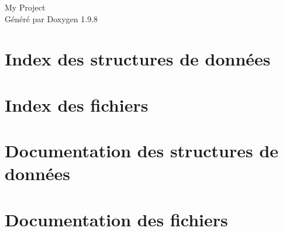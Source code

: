 \documentclass[twoside]{book}
\newcommand{\+}{\discretionary{\mbox{\scriptsize$\hookleftarrow$}}{}{}}
\newcommand{\clearemptydoublepage}{%
    \newpage{\pagestyle{empty}\cleardoublepage}%
  }
\begin{document}
  \raggedbottom
  \begin{titlepage}
  \vspace*{7cm}
  \begin{center}%
  {\Large My Project}\\
  \vspace*{1cm}
  {\large Généré par Doxygen 1.9.8}\\
  \end{center}
  \end{titlepage}
  \clearemptydoublepage
  \tableofcontents
  \clearemptydoublepage
\chapter{Index des structures de données}

\chapter{Index des fichiers}

\chapter{Documentation des structures de données}


\chapter{Documentation des fichiers}

  \backmatter
  \newpage
  \clearemptydoublepage
  \printindex
\end{document}
